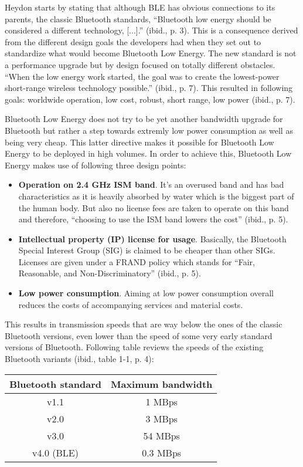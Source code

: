 Heydon starts by stating that although BLE has obvious connections to its parents, the classic Bluetooth standards, \enquote{Bluetooth low energy should be considered a different technology, [...].} (ibid., p. 3). This is a consequence derived from the different design goals the developers had when they set out to standardize what would become Bluetooth Low Energy. The new standard is not a performance upgrade but by design focused on totally different obstacles. \enquote{When the low energy work started, the goal was to create the lowest-power short-range wireless technology possible.} (ibid., p. 7). This resulted in following goals: worldwide operation, low cost, robust, short range, low power (ibid., p. 7).

Bluetooth Low Energy does not try to be yet another bandwidth upgrade for Bluetooth but rather a step towards extremly low power consumption as well as being very cheap. This latter directive makes it possible for Bluetooth Low Energy to be deployed in high volumes. In order to achieve this, Bluetooth Low Energy makes use of following three design points:

\begin{itemize}
    \item \textbf{Operation on 2.4 GHz ISM band}. It's an overused band and has bad characteristics as it is heavily absorbed by water which is the biggest part of the human body. But also no license fees are taken to operate on this band and therefore, \enquote{choosing to use the ISM band lowers the cost} (ibid., p. 5).
    \item \textbf{Intellectual property (IP) license for usage}. Basically, the Bluetooth Special Interest Group (SIG) is claimed to be cheaper than other SIGs. Licenses are given under a FRAND policy which stands for \enquote{Fair, Reasonable, and Non-Discriminatory} (ibid., p. 5).
    \item \textbf{Low power consumption}. Aiming at low power consumption overall reduces the costs of accompanying services and material costs.
\end{itemize}

This results in transmission speeds that are way below the ones of the classic Bluetooth versions, even lower than the speed of some very early standard versions of Bluetooth. Following table reviews the speeds of the existing Bluetooth variants (ibid., table 1-1, p. 4):

\begin{center}

    \begin{tabular}{ c | c }
        \textbf{Bluetooth standard} &   \textbf{Maximum bandwidth} \\
        \hline
        v1.1                        &   1 MBps \\
        v2.0                        &   3 MBps \\
        v3.0                        &   54 MBps \\
        v4.0 (BLE)                  &   0.3 MBps
    \end{tabular}

\end{center}

